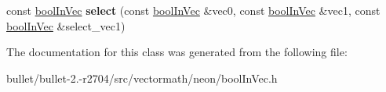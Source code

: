 \begin{DoxyCompactItemize}
\item 
\hypertarget{class_vectormath_1_1bool_in_vec_ac6cfb2aee5afd68adfddecc9f41d915b}{const \hyperlink{class_vectormath_1_1bool_in_vec}{bool\+In\+Vec} {\bfseries select} (const \hyperlink{class_vectormath_1_1bool_in_vec}{bool\+In\+Vec} \&vec0, const \hyperlink{class_vectormath_1_1bool_in_vec}{bool\+In\+Vec} \&vec1, const \hyperlink{class_vectormath_1_1bool_in_vec}{bool\+In\+Vec} \&select\+\_\+vec1)}\label{class_vectormath_1_1bool_in_vec_ac6cfb2aee5afd68adfddecc9f41d915b}

\end{DoxyCompactItemize}


The documentation for this class was generated from the following file\+:\begin{DoxyCompactItemize}
\item 
bullet/bullet-\/2.-\/r2704/src/vectormath/neon/bool\+In\+Vec.\+h\end{DoxyCompactItemize}
